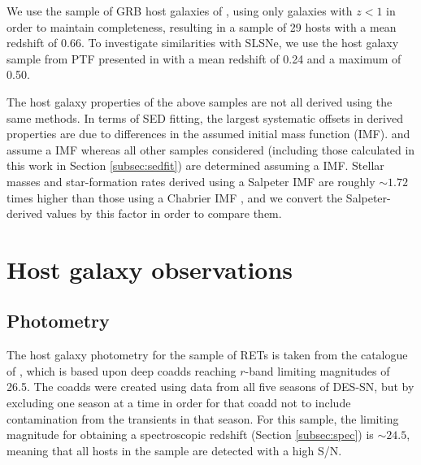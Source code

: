 \documentclass[fleqn,usenatbib,]{mnras}
\begin{document}
We use the sample of GRB host galaxies of \citet{Kruehler2015}, using only galaxies with $z<1$ in order to maintain completeness, resulting in a sample of 29 hosts with a mean redshift of 0.66. To investigate similarities with SLSNe, we use the host galaxy sample from PTF presented in \citet{Perley2016c} with a mean redshift of 0.24 and a maximum of 0.50.

The host galaxy properties of the above samples are not all derived using the same methods. In terms of SED fitting, the largest systematic offsets in derived properties are due to differences in the assumed initial mass function (IMF). \citet{Stoll2013} and \citet{Drout2014} assume a \citet{Salpeter1955} IMF whereas all other samples considered (including those calculated in this work in Section \ref{subsec:sedfit}) are determined assuming a \citet{Chabrier2003} IMF. Stellar masses and star-formation rates derived using a Salpeter IMF are roughly $\sim 1.72$ times higher than those using a Chabrier IMF \citep{Speagle2014}, and we convert the Salpeter-derived values by this factor in order to compare them.

\section{Host galaxy observations}
\label{sec:obs}
\subsection{Photometry \label{subsec:phot}}

The host galaxy photometry for the sample of RETs is taken from the catalogue of \citet{Wiseman2020}, which is based upon deep coadds reaching $r$-band limiting magnitudes of 26.5. The coadds were created using data from all five seasons of DES-SN, but by excluding one season at a time in order for that coadd not to include contamination from the transients in that season. For this sample, the limiting magnitude for obtaining a spectroscopic redshift (Section \ref{subsec:spec}) is $\sim 24.5$, meaning that all hosts in the sample are detected with a high S/N.
\end{document}
